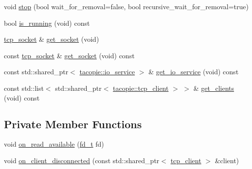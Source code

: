 \begin{DoxyCompactItemize}
void \hyperlink{classtacopie_1_1tcp__server_abc099e162432e2218faed93fc84180fd}{stop} (bool wait\+\_\+for\+\_\+removal=false, bool recursive\+\_\+wait\+\_\+for\+\_\+removal=true)
\item 
bool \hyperlink{classtacopie_1_1tcp__server_a76162141e6443953f3ad8e11c4e4d3d7}{is\+\_\+running} (void) const
\item 
\hyperlink{classtacopie_1_1tcp__socket}{tcp\+\_\+socket} \& \hyperlink{classtacopie_1_1tcp__server_a39a51b9203d42babfd9c4c1a0f4cc340}{get\+\_\+socket} (void)
\item 
const \hyperlink{classtacopie_1_1tcp__socket}{tcp\+\_\+socket} \& \hyperlink{classtacopie_1_1tcp__server_a373aec294e24a52c3ef6c44920af36e2}{get\+\_\+socket} (void) const
\item 
const std\+::shared\+\_\+ptr$<$ \hyperlink{classtacopie_1_1io__service}{tacopie\+::io\+\_\+service} $>$ \& \hyperlink{classtacopie_1_1tcp__server_aace4796627b6abccccce1a541908414f}{get\+\_\+io\+\_\+service} (void) const
\item 
const std\+::list$<$ std\+::shared\+\_\+ptr$<$ \hyperlink{classtacopie_1_1tcp__client}{tacopie\+::tcp\+\_\+client} $>$ $>$ \& \hyperlink{classtacopie_1_1tcp__server_a0df81b943243ad51102c37d4944be8d7}{get\+\_\+clients} (void) const
\end{DoxyCompactItemize}
\subsection*{Private Member Functions}
\begin{DoxyCompactItemize}
\item 
void \hyperlink{classtacopie_1_1tcp__server_a62b4b67ab9554b27881be8dbe869cc6e}{on\+\_\+read\+\_\+available} (\hyperlink{namespacetacopie_acce7ad26b2d30156b1e6fa353f727026}{fd\+\_\+t} fd)
\item 
void \hyperlink{classtacopie_1_1tcp__server_ad98bdefae28be6b16a213bf5bedbf7d9}{on\+\_\+client\+\_\+disconnected} (const std\+::shared\+\_\+ptr$<$ \hyperlink{classtacopie_1_1tcp__client}{tcp\+\_\+client} $>$ \&client)
\end{DoxyCompactItemize}
